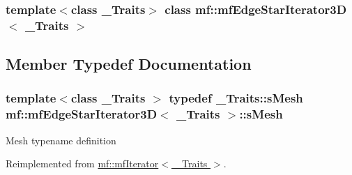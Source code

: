 \subsubsection*{template$<$class \_\-Traits$>$ class mf::mfEdgeStarIterator3D$<$ \_\-Traits $>$}



\subsection{Member Typedef Documentation}
\hypertarget{classmf_1_1mfEdgeStarIterator3D_a875ac7316bdc779e38b0a8befde57366}{
\subsubsection[{sMesh}]{\setlength{\rightskip}{0pt plus 5cm}template$<$class \_\-Traits $>$ typedef \_\-Traits::sMesh {\bf mf::mfEdgeStarIterator3D}$<$ \_\-Traits $>$::{\bf sMesh}}}
\label{classmf_1_1mfEdgeStarIterator3D_a875ac7316bdc779e38b0a8befde57366}
Mesh typename definition 

Reimplemented from \hyperlink{classmf_1_1mfIterator_aca31e4d7e7eca4e3b100530d8725064b}{mf::mfIterator$<$ \_\-Traits $>$}.



